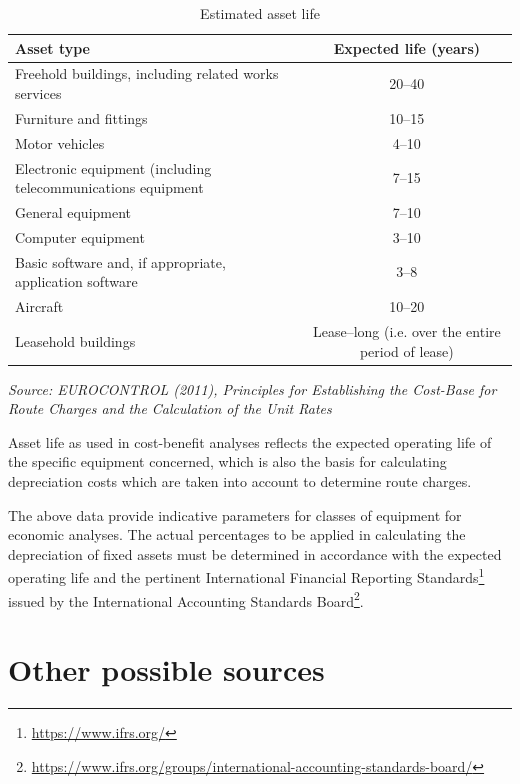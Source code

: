 \documentclass[
  11pt,
  a4paper,
]{book}
\DeclareRobustCommand{\href}[2]{#2\footnote{\url{#1}}}
\begin{document}
\hypertarget{tbl-asset-life}{}
\setlength{\LTpost}{0mm}
\begin{longtable}{lc}
\caption{\label{tbl-asset-life}Estimated asset life }\tabularnewline

\toprule
Asset type & Expected life (years) \\ 
\midrule
Freehold buildings, including related works services & 20–40 \\ 
Furniture and fittings & 10–15 \\ 
Motor vehicles & 4–10 \\ 
Electronic equipment (including telecommunications equipment & 7–15 \\ 
General equipment & 7–10 \\ 
Computer equipment & 3–10 \\ 
Basic software and, if appropriate, application software & 3–8 \\ 
Aircraft & 10–20 \\ 
Leasehold buildings & Lease–long (i.e. over the entire period of lease) \\ 
\bottomrule
\end{longtable}
\begin{minipage}{\linewidth}
\emph{Source: EUROCONTROL (2011), Principles for Establishing the Cost-Base for Route Charges and the Calculation of the Unit Rates}\\
\end{minipage}

Asset life as used in cost-benefit analyses reflects the expected
operating life of the specific equipment concerned, which is also the
basis for calculating depreciation costs which are taken into account to
determine route charges.

The above data provide indicative parameters for classes of equipment
for economic analyses. The actual percentages to be applied in
calculating the depreciation of fixed assets must be determined in
accordance with the expected operating life and the pertinent
\href{https://www.ifrs.org/}{International Financial Reporting
Standards} issued by the
\href{https://www.ifrs.org/groups/international-accounting-standards-board/}{International
Accounting Standards Board}.

\hypertarget{other-possible-sources-4}{%
\section{Other possible sources}\label{other-possible-sources-4}}
\end{document}

